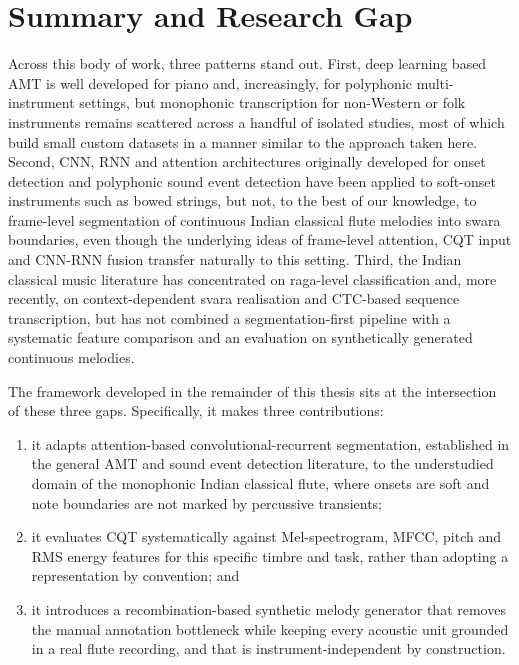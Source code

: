 \section{Summary and Research Gap}
\label{sec:gap}

Across this body of work, three patterns stand out. First, deep learning based AMT is well developed for piano and, increasingly, for polyphonic multi-instrument settings, but monophonic transcription for non-Western or folk instruments remains scattered across a handful of isolated studies, most of which build small custom datasets in a manner similar to the approach taken here. Second, CNN, RNN and attention architectures originally developed for onset detection and polyphonic sound event detection have been applied to soft-onset instruments such as bowed strings, but not, to the best of our knowledge, to frame-level segmentation of continuous Indian classical flute melodies into swara boundaries, even though the underlying ideas of frame-level attention, CQT input and CNN-RNN fusion transfer naturally to this setting. Third, the Indian classical music literature has concentrated on raga-level classification and, more recently, on context-dependent svara realisation and CTC-based sequence transcription, but has not combined a segmentation-first pipeline with a systematic feature comparison and an evaluation on synthetically generated continuous melodies.

The framework developed in the remainder of this thesis sits at the intersection of these three gaps. Specifically, it makes three contributions:

\begin{enumerate}
    \item[(i)] it adapts attention-based convolutional-recurrent segmentation, established in the general AMT and sound event detection literature, to the understudied domain of the monophonic Indian classical flute, where onsets are soft and note boundaries are not marked by percussive transients;
    \item[(ii)] it evaluates CQT systematically against Mel-spectrogram, MFCC, pitch and RMS energy features for this specific timbre and task, rather than adopting a representation by convention; and
    \item[(iii)] it introduces a recombination-based synthetic melody generator that removes the manual annotation bottleneck while keeping every acoustic unit grounded in a real flute recording, and that is instrument-independent by construction.
\end{enumerate}
